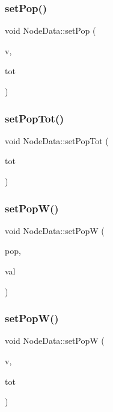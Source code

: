 \subsubsection{\texorpdfstring{setPop()}{setPop()}\hspace{0.1cm}{\footnotesize\ttfamily [2/2]}}
{\footnotesize\ttfamily void Node\+Data\+::set\+Pop (\begin{DoxyParamCaption}\item[{Q\+List$<$ double $>$}]{v,  }\item[{double}]{tot }\end{DoxyParamCaption})}

\mbox{\label{class_node_data_ad47e9ef6b7b0dd39c74d2996f83dcce5}} 
\subsubsection{\texorpdfstring{setPopTot()}{setPopTot()}}
{\footnotesize\ttfamily void Node\+Data\+::set\+Pop\+Tot (\begin{DoxyParamCaption}\item[{double}]{tot }\end{DoxyParamCaption})}

\mbox{\label{class_node_data_a519177cacb6e51ae623555a092a5f2b3}} 
\subsubsection{\texorpdfstring{setPopW()}{setPopW()}\hspace{0.1cm}{\footnotesize\ttfamily [1/2]}}
{\footnotesize\ttfamily void Node\+Data\+::set\+PopW (\begin{DoxyParamCaption}\item[{int}]{pop,  }\item[{double}]{val }\end{DoxyParamCaption})}

\mbox{\label{class_node_data_a6af682956531adb5a57b0513f1deaffd}} 
\subsubsection{\texorpdfstring{setPopW()}{setPopW()}\hspace{0.1cm}{\footnotesize\ttfamily [2/2]}}
{\footnotesize\ttfamily void Node\+Data\+::set\+PopW (\begin{DoxyParamCaption}\item[{Q\+List$<$ double $>$}]{v,  }\item[{double}]{tot }\end{DoxyParamCaption})}


